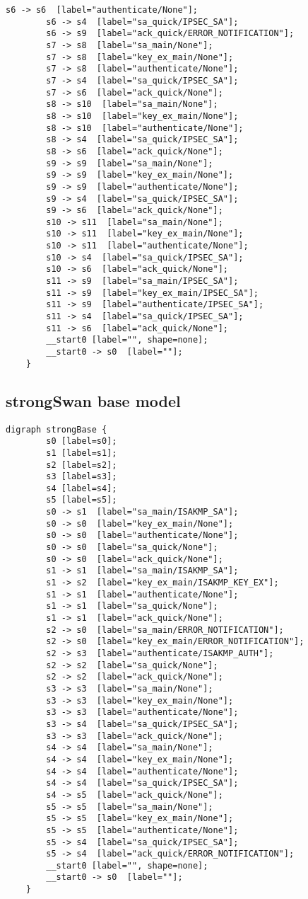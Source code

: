 \begin{appendices}
\begin{lstlisting}[numbers=none]
		s6 -> s6  [label="authenticate/None"];
		s6 -> s4  [label="sa_quick/IPSEC_SA"];
		s6 -> s9  [label="ack_quick/ERROR_NOTIFICATION"];
		s7 -> s8  [label="sa_main/None"];
		s7 -> s8  [label="key_ex_main/None"];
		s7 -> s8  [label="authenticate/None"];
		s7 -> s4  [label="sa_quick/IPSEC_SA"];
		s7 -> s6  [label="ack_quick/None"];
		s8 -> s10  [label="sa_main/None"];
		s8 -> s10  [label="key_ex_main/None"];
		s8 -> s10  [label="authenticate/None"];
		s8 -> s4  [label="sa_quick/IPSEC_SA"];
		s8 -> s6  [label="ack_quick/None"];
		s9 -> s9  [label="sa_main/None"];
		s9 -> s9  [label="key_ex_main/None"];
		s9 -> s9  [label="authenticate/None"];
		s9 -> s4  [label="sa_quick/IPSEC_SA"];
		s9 -> s6  [label="ack_quick/None"];
		s10 -> s11  [label="sa_main/None"];
		s10 -> s11  [label="key_ex_main/None"];
		s10 -> s11  [label="authenticate/None"];
		s10 -> s4  [label="sa_quick/IPSEC_SA"];
		s10 -> s6  [label="ack_quick/None"];
		s11 -> s9  [label="sa_main/IPSEC_SA"];
		s11 -> s9  [label="key_ex_main/IPSEC_SA"];
		s11 -> s9  [label="authenticate/IPSEC_SA"];
		s11 -> s4  [label="sa_quick/IPSEC_SA"];
		s11 -> s6  [label="ack_quick/None"];
		__start0 [label="", shape=none];
		__start0 -> s0  [label=""];
	}
\end{lstlisting}
\newpage

\subsection*{strongSwan base model}
\begin{lstlisting}[numbers=none]
	digraph strongBase {
		s0 [label=s0];
		s1 [label=s1];
		s2 [label=s2];
		s3 [label=s3];
		s4 [label=s4];
		s5 [label=s5];
		s0 -> s1  [label="sa_main/ISAKMP_SA"];
		s0 -> s0  [label="key_ex_main/None"];
		s0 -> s0  [label="authenticate/None"];
		s0 -> s0  [label="sa_quick/None"];
		s0 -> s0  [label="ack_quick/None"];
		s1 -> s1  [label="sa_main/ISAKMP_SA"];
		s1 -> s2  [label="key_ex_main/ISAKMP_KEY_EX"];
		s1 -> s1  [label="authenticate/None"];
		s1 -> s1  [label="sa_quick/None"];
		s1 -> s1  [label="ack_quick/None"];
		s2 -> s0  [label="sa_main/ERROR_NOTIFICATION"];
		s2 -> s0  [label="key_ex_main/ERROR_NOTIFICATION"];
		s2 -> s3  [label="authenticate/ISAKMP_AUTH"];
		s2 -> s2  [label="sa_quick/None"];
		s2 -> s2  [label="ack_quick/None"];
		s3 -> s3  [label="sa_main/None"];
		s3 -> s3  [label="key_ex_main/None"];
		s3 -> s3  [label="authenticate/None"];
		s3 -> s4  [label="sa_quick/IPSEC_SA"];
		s3 -> s3  [label="ack_quick/None"];
		s4 -> s4  [label="sa_main/None"];
		s4 -> s4  [label="key_ex_main/None"];
		s4 -> s4  [label="authenticate/None"];
		s4 -> s4  [label="sa_quick/IPSEC_SA"];
		s4 -> s5  [label="ack_quick/None"];
		s5 -> s5  [label="sa_main/None"];
		s5 -> s5  [label="key_ex_main/None"];
		s5 -> s5  [label="authenticate/None"];
		s5 -> s4  [label="sa_quick/IPSEC_SA"];
		s5 -> s4  [label="ack_quick/ERROR_NOTIFICATION"];
		__start0 [label="", shape=none];
		__start0 -> s0  [label=""];
	}
\end{lstlisting}
\newpage


\end{appendices}

